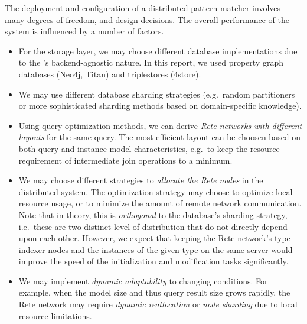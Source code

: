 The deployment and configuration of a distributed pattern matcher involves many degrees of freedom, and design decisions. The overall performance of the system is influenced by a number of factors.

\begin{itemize}
  \item For the storage layer, we may choose different database implementations due to the \iqd{}'s backend-agnostic nature. In this report, we used property graph databases (Neo4j, Titan) and triplestores (4store).
  \item We may use different database sharding strategies (e.g.\ random partitioners or more sophisticated sharding methods based on domain-specific knowledge).
  \item Using query optimization methods, we can derive \emph{Rete networks with different layouts} for the same query. The most efficient layout can be choosen based on both query and instance model characteristics, e.g.\ to keep the resource requirement of intermediate join operations to a minimum.
  \item We may choose different strategies to \emph{allocate the Rete nodes} in the distributed system. The optimization strategy may choose to optimize local resource usage, or to minimize the amount of remote network communication. Note that in theory, this is \emph{orthogonal} to the database's sharding strategy, i.e.\ these are two distinct level of distribution that do not directly depend upon each other. However, we expect that keeping the Rete network's type indexer nodes and the instances of the given type on the same server would improve the speed of the initialization and modification tasks significantly.
  \item We may implement \emph{dynamic adaptability} to changing conditions. For example, when the model size and thus query result size grows rapidly, the Rete network may require \emph{dynamic reallocation} or \emph{node sharding} due to local resource limitations.
\end{itemize}


% 

